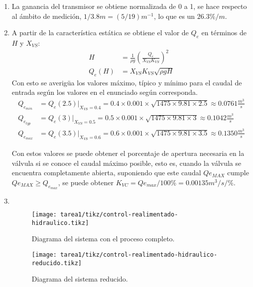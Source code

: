\begin{ejercicio}

  \begin{enumerate}
    \item %
    La ganancia del transmisor se obtiene normalizada de 0 a 1, se hace respecto al ámbito de medición, $1/3.8m = (5/19)m^{-1}$, lo que es un $26.3\%/m$.

    \item %
    A partir de la característica estática se obtiene el valor de $Q_e$ en términos de $H$ y $X_{VS}$:
    \begin{align*}
    H &=\frac{1}{\rho g} \left( \frac{Q_e}{X_{VS}K_{VS}} \right)^2
    \\
    Q_e(H) &= X_{VS} K_{VS}\sqrt{\rho g H}
    \end{align*}
    Con esto se averigüa los valores máximo, típico y mínimo para el caudal de entrada según los valores en el enunciado según corresponda.
    \begin{align*}
    Q_{e_{min}} &= Q_{e}(2.5)|_{X_{VS}=0.4} = 0.4 \times 0.001 \times \sqrt{1475\times9.81\times2.5} \approx 0.0761 \frac{m^3}{s}
    \\
    Q_{e_{typ}} &= Q_{e}(3)|_{X_{VS}=0.5} = 0.5 \times 0.001 \times \sqrt{1475\times9.81\times3} \approx 0.1042 \frac{m^3}{s}
    \\
    Q_{e_{max}} &= Q_{e}(3.5)|_{X_{VS}=0.6} = 0.6 \times 0.001 \times \sqrt{1475\times9.81\times3.5} \approx 0.1350 \frac{m^3}{s}
    \end{align*}

    Con estos valores se puede obtener el porcentaje de apertura necesaria en la válvula si se conoce el caudal máximo posible, esto es, cuando la válvula se encuentra completamente abierta, suponiendo que este caudal $Q{e_{MAX}}$ cumple $Q{e_{MAX}} \geq Q_{e_{max}}$, se puede obtener $K_{VC}=Q{e_{max}}/100\%=0.00135m^3/s/\%$.

    \item %
      $\quad$
    \begin{figure}[H]
      \centering
      \texttt{[image: tarea1/tikz/control-realimentado-hidraulico.tikz]}
      \caption{Diagrama del sistema con el proceso completo.}
      \label{ej1:diag1}
    \end{figure}
          \begin{figure}[H]
    \centering
      \texttt{[image: tarea1/tikz/control-realimentado-hidraulico-reducido.tikz]}
      \caption{Diagrama del sistema reducido.}
      \label{ej1:diag2}
    \end{figure}


\end{enumerate}
\end{ejercicio}
